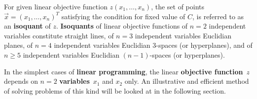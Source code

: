 \medskip
\noindent
For given linear objective function $z(x_{1},\ldots,x_{n})$, the set of points $\vec{x} = (x_{1},\ldots,x_{n})^{T}$ satisfying the condition
%
\be
{}
\ee
%
for fixed value of $C$, is referred to as an {\bf isoquant} of 
$z$. {\bf Isoquants} of linear objective functions of $n=2$ 
independent variables constitute straight lines, of $n=3$ 
independent variables Euclidian planes, of $n=4$ independent 
variables Euclidian 3-spaces (or hyperplanes), and of $n\geq 5$ 
independent variables Euclidian $(n-1)$-spaces (or hyperplanes).

\medskip
\noindent
In the simplest cases of {\bf linear programming}, the linear {\bf 
objective function}~$z$ depends on $n=2$ {\bf variables}~$x_{1}$ 
and $x_{2}$ only. An illustrative and efficient method of solving 
problems of this kind will be looked at in the following section.

